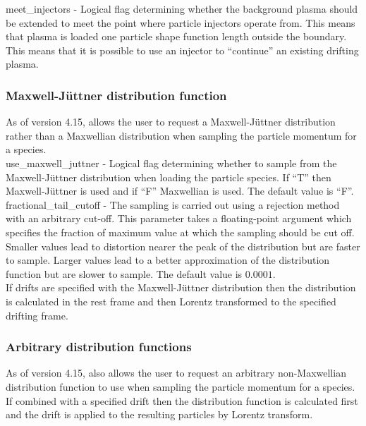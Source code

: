 {\emphtext meet\_injectors} - Logical flag determining whether the background
plasma
should be extended to meet the point where particle injectors operate from.
This means that plasma is loaded one particle shape function length outside the
boundary. This means that it is possible to use an injector to ``continue'' an
existing drifting plasma. 

\subsubsection{Maxwell-J\"uttner distribution function}
\label{sec:maxwell_juttner}

As of version 4.15, \EPOCH allows the user to request a Maxwell-J\"uttner
distribution rather than a Maxwellian distribution when sampling the particle
momentum for a species.\\

{\emphtext use\_maxwell\_juttner} - Logical flag determining whether to sample
  from the Maxwell-J\"uttner distribution when loading the particle species.
  If ``T'' then Maxwell-J\"uttner is used and if ``F'' Maxwellian is used.
  The default value is ``F''.\\

{\emphtext fractional\_tail\_cutoff} - The sampling is carried out using a
  rejection method with an arbitrary cut-off. This parameter takes a
  floating-point argument which specifies the fraction of maximum value at
  which the sampling should be cut off. Smaller values lead to distortion
  nearer the peak of the distribution but are faster to sample. Larger values
  lead to a better approximation of the distribution function but are slower
  to sample. The default value is $0.0001$.\\

If drifts are specified with the Maxwell-J\"uttner distribution then the
distribution is calculated in the rest frame and then Lorentz transformed to
the specified drifting frame.

\subsubsection{Arbitrary distribution functions}
\label{sec:arbitrary_dist_fn}

As of version 4.15, \EPOCH also allows the user to request an arbitrary
non-Maxwellian distribution function to use when sampling the particle
momentum for a species. If combined with a specified drift then the
distribution function is calculated first and the drift is applied to the
resulting particles by Lorentz transform.

